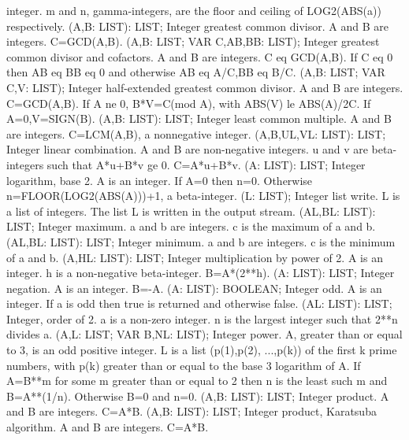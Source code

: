 integer.  m and n, gamma-integers, are the floor and ceiling of
LOG2(ABS(a)) respectively. \ecom 
{} (A,B: LIST): LIST; \eproc
\bcom Integer greatest common divisor. A and B are integers. C=GCD(A,B). \ecom 
{} (A,B: LIST; VAR C,AB,BB: LIST); \eproc
\bcom Integer greatest common divisor and cofactors. A and B are integers.
C eq GCD(A,B).  If C eq 0 then AB eq BB eq 0 and otherwise
AB eq A/C,BB eq B/C. \ecom 
{} (A,B: LIST; VAR C,V: LIST); \eproc
\bcom Integer half-extended greatest common divisor. A and B are integers.
C=GCD(A,B).  If A ne 0, B*V=C(mod A), with ABS(V) le ABS(A)/2C.  If
A=0,V=SIGN(B). \ecom 
{} (A,B: LIST): LIST; \eproc
\bcom Integer least common multiple. A and B are integers.
C=LCM(A,B), a nonnegative integer. \ecom 
{} (A,B,UL,VL: LIST): LIST; \eproc
\bcom Integer linear combination. A and B are non-negative integers.
u and v are beta-integers such that A*u+B*v ge 0. C=A*u+B*v. \ecom 
{} (A: LIST): LIST; \eproc
\bcom Integer logarithm, base 2. A is an integer. If A=0 then n=0.
Otherwise n=FLOOR(LOG2(ABS(A)))+1, a beta-integer. \ecom 
{} (L: LIST); \eproc
\bcom Integer list write. L is a list of integers. The list L is written
in the output stream. \ecom 
{} (AL,BL: LIST): LIST; \eproc
\bcom Integer maximum. a and b are integers. c is the maximum of a
and b. \ecom 
{} (AL,BL: LIST): LIST; \eproc
\bcom Integer minimum. a and b are integers. c is the minimum of a
and b. \ecom 
{} (A,HL: LIST): LIST; \eproc
\bcom Integer multiplication by power of 2. A is an integer. h is a
non-negative beta-integer. B=A*(2**h). \ecom 
{} (A: LIST): LIST; \eproc
\bcom Integer negation. A is an integer. B=-A. \ecom 
{} (A: LIST): BOOLEAN; \eproc
\bcom Integer odd. A is an integer. If a is odd then true is returned
and otherwise false.  \ecom 
{} (AL: LIST): LIST; \eproc
\bcom Integer, order of 2. a is a non-zero integer. n is the largest
integer such that 2**n divides a. \ecom 
{} (A,L: LIST; VAR B,NL: LIST); \eproc
\bcom Integer power. A, greater than or equal to 3, is an odd positive
integer.  L is a list (p(1),p(2), ...,p(k)) of the first k prime
numbers, with p(k) greater than or equal to the base 3 logarithm of A.
If A=B**m for some m greater than or equal to 2 then n is the least
such m and B=A**(1/n). Otherwise B=0 and n=0. \ecom 
{} (A,B: LIST): LIST; \eproc
\bcom Integer product. A and B are integers. C=A*B. \ecom 
{} (A,B: LIST): LIST; \eproc
\bcom Integer product, Karatsuba algorithm. A and B are integers. C=A*B. \ecom 
